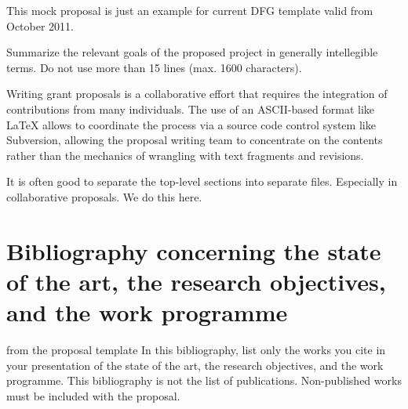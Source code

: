 \documentclass[RAM]{dfgproposal}
\begin{document}
\begin{center}\color{red}\huge
  This mock proposal is just an example for %
  current DFG template valid from October 2011.
\end{center}

\begin{proposal}[PI=miko,site=jacu,PI=gc,site=jacu,site=pcg,
  acronym={iPoWr},
  months=24]

\begin{Summary}
  \begin{todo}{}
    Summarize the relevant goals of the proposed project in generally intellegible
    terms. Do not use more than 15 lines (max. 1600 characters).
  \end{todo}
  Writing grant proposals is a collaborative effort that requires the integration of
  contributions from many individuals. The use of an ASCII-based format like LaTeX allows
  to coordinate the process via a source code control system like Subversion, allowing the
  proposal writing team to concentrate on the contents rather than the mechanics of
  wrangling with text fragments and revisions.
\end{Summary}




 It is often good to separate the top-level sections into separate files. 
 Especially in collaborative proposals. We do this here. 
%
%

\section{Bibliography concerning the state of the art, the research objectives, and the
work programme} %

\begin{todo}{from the proposal template}
In this bibliography, list only the works you cite in your presentation of the state of the
art, the research objectives, and the work programme. This bibliography is not the list
of publications. Non-published works must be included with the proposal.
\end{todo}
%
%


\end{proposal}
\end{document}
